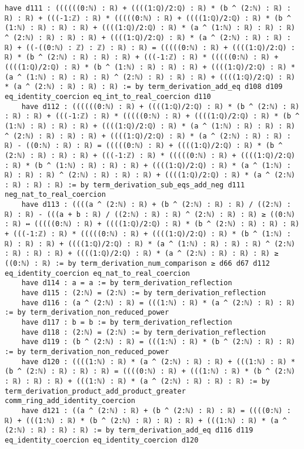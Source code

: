 \documentclass{article}
\begin{document}
\begin{tcolorbox}[colback=white!10, width=\linewidth]
\begin{lstlisting}[language=Lean4]
    have d111 : ((((((0:ℕ) : ℝ) + ((((1:ℚ)/2:ℚ) : ℝ) * (b ^ (2:ℕ) : ℝ) : ℝ) : ℝ) + (((-1:ℤ) : ℝ) * (((((0:ℕ) : ℝ) + ((((1:ℚ)/2:ℚ) : ℝ) * (b ^ (1:ℕ) : ℝ) : ℝ) : ℝ) + ((((1:ℚ)/2:ℚ) : ℝ) * (a ^ (1:ℕ) : ℝ) : ℝ) : ℝ) ^ (2:ℕ) : ℝ) : ℝ) : ℝ) + ((((1:ℚ)/2:ℚ) : ℝ) * (a ^ (2:ℕ) : ℝ) : ℝ) : ℝ) + ((-((0:ℕ) : ℤ) : ℤ) : ℝ) : ℝ) = (((((0:ℕ) : ℝ) + ((((1:ℚ)/2:ℚ) : ℝ) * (b ^ (2:ℕ) : ℝ) : ℝ) : ℝ) + (((-1:ℤ) : ℝ) * (((((0:ℕ) : ℝ) + ((((1:ℚ)/2:ℚ) : ℝ) * (b ^ (1:ℕ) : ℝ) : ℝ) : ℝ) + ((((1:ℚ)/2:ℚ) : ℝ) * (a ^ (1:ℕ) : ℝ) : ℝ) : ℝ) ^ (2:ℕ) : ℝ) : ℝ) : ℝ) + ((((1:ℚ)/2:ℚ) : ℝ) * (a ^ (2:ℕ) : ℝ) : ℝ) : ℝ) := by term_derivation_add_eq d108 d109 eq_identity_coercion eq_int_to_real_coercion d110
    have d112 : ((((((0:ℕ) : ℝ) + ((((1:ℚ)/2:ℚ) : ℝ) * (b ^ (2:ℕ) : ℝ) : ℝ) : ℝ) + (((-1:ℤ) : ℝ) * (((((0:ℕ) : ℝ) + ((((1:ℚ)/2:ℚ) : ℝ) * (b ^ (1:ℕ) : ℝ) : ℝ) : ℝ) + ((((1:ℚ)/2:ℚ) : ℝ) * (a ^ (1:ℕ) : ℝ) : ℝ) : ℝ) ^ (2:ℕ) : ℝ) : ℝ) : ℝ) + ((((1:ℚ)/2:ℚ) : ℝ) * (a ^ (2:ℕ) : ℝ) : ℝ) : ℝ) - ((0:ℕ) : ℝ) : ℝ) = (((((0:ℕ) : ℝ) + ((((1:ℚ)/2:ℚ) : ℝ) * (b ^ (2:ℕ) : ℝ) : ℝ) : ℝ) + (((-1:ℤ) : ℝ) * (((((0:ℕ) : ℝ) + ((((1:ℚ)/2:ℚ) : ℝ) * (b ^ (1:ℕ) : ℝ) : ℝ) : ℝ) + ((((1:ℚ)/2:ℚ) : ℝ) * (a ^ (1:ℕ) : ℝ) : ℝ) : ℝ) ^ (2:ℕ) : ℝ) : ℝ) : ℝ) + ((((1:ℚ)/2:ℚ) : ℝ) * (a ^ (2:ℕ) : ℝ) : ℝ) : ℝ) := by term_derivation_sub_eqs_add_neg d111 neg_nat_to_real_coercion
    have d113 : ((((a ^ (2:ℕ) : ℝ) + (b ^ (2:ℕ) : ℝ) : ℝ) / ((2:ℕ) : ℝ) : ℝ) - (((a + b : ℝ) / ((2:ℕ) : ℝ) : ℝ) ^ (2:ℕ) : ℝ) : ℝ) ≥ ((0:ℕ) : ℝ) ↔ (((((0:ℕ) : ℝ) + ((((1:ℚ)/2:ℚ) : ℝ) * (b ^ (2:ℕ) : ℝ) : ℝ) : ℝ) + (((-1:ℤ) : ℝ) * (((((0:ℕ) : ℝ) + ((((1:ℚ)/2:ℚ) : ℝ) * (b ^ (1:ℕ) : ℝ) : ℝ) : ℝ) + ((((1:ℚ)/2:ℚ) : ℝ) * (a ^ (1:ℕ) : ℝ) : ℝ) : ℝ) ^ (2:ℕ) : ℝ) : ℝ) : ℝ) + ((((1:ℚ)/2:ℚ) : ℝ) * (a ^ (2:ℕ) : ℝ) : ℝ) : ℝ) ≥ ((0:ℕ) : ℝ) := by term_derivation_num_comparison ≥ d66 d67 d112 eq_identity_coercion eq_nat_to_real_coercion
    have d114 : a = a := by term_derivation_reflection
    have d115 : (2:ℕ) = (2:ℕ) := by term_derivation_reflection
    have d116 : (a ^ (2:ℕ) : ℝ) = (((1:ℕ) : ℝ) * (a ^ (2:ℕ) : ℝ) : ℝ) := by term_derivation_non_reduced_power
    have d117 : b = b := by term_derivation_reflection
    have d118 : (2:ℕ) = (2:ℕ) := by term_derivation_reflection
    have d119 : (b ^ (2:ℕ) : ℝ) = (((1:ℕ) : ℝ) * (b ^ (2:ℕ) : ℝ) : ℝ) := by term_derivation_non_reduced_power
    have d120 : ((((1:ℕ) : ℝ) * (a ^ (2:ℕ) : ℝ) : ℝ) + (((1:ℕ) : ℝ) * (b ^ (2:ℕ) : ℝ) : ℝ) : ℝ) = ((((0:ℕ) : ℝ) + (((1:ℕ) : ℝ) * (b ^ (2:ℕ) : ℝ) : ℝ) : ℝ) + (((1:ℕ) : ℝ) * (a ^ (2:ℕ) : ℝ) : ℝ) : ℝ) := by term_derivation_product_add_product_greater comm_ring_add_identity_coercion
    have d121 : ((a ^ (2:ℕ) : ℝ) + (b ^ (2:ℕ) : ℝ) : ℝ) = ((((0:ℕ) : ℝ) + (((1:ℕ) : ℝ) * (b ^ (2:ℕ) : ℝ) : ℝ) : ℝ) + (((1:ℕ) : ℝ) * (a ^ (2:ℕ) : ℝ) : ℝ) : ℝ) := by term_derivation_add_eq d116 d119 eq_identity_coercion eq_identity_coercion d120

\end{lstlisting}
\end{tcolorbox}
\end{document}

